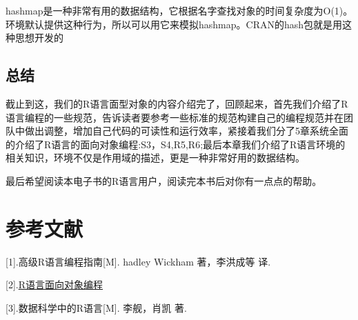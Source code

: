 \documentclass[]{book}
\begin{document}
hashmap是一种非常有用的数据结构，它根据名字查找对象的时间复杂度为O(1)。环境默认提供这种行为，所以可以用它来模拟hashmap。CRAN的hash包就是用这种思想开发的

\section{总结}

截止到这，我们的R语言面型对象的内容介绍完了，回顾起来，首先我们介绍了R语言编程的一些规范，告诉读者要参考一些标准的规范构建自己的编程规范并在团队中做出调整，增加自己代码的可读性和运行效率，紧接着我们分了5章系统全面的介绍了R语言的面向对象编程:S3，S4,R5,R6;最后本章我们介绍了R语言环境的相关知识，环境不仅是作用域的描述，更是一种非常好用的数据结构。

最后希望阅读本电子书的R语言用户，阅读完本书后对你有一点点的帮助。

\chapter{参考文献}\label{Reference}

{[}1{]}.高级R语言编程指南{[}M{]}. hadley Wickham 著，李洪成等 译.

{[}2{]}.\href{https://wenku.baidu.com/view/fc1b919e10a6f524cdbf857d.html}{R语言面向对象编程}

{[}3{]}.数据科学中的R语言{[}M{]}. 李舰，肖凯 著.


\end{document}
